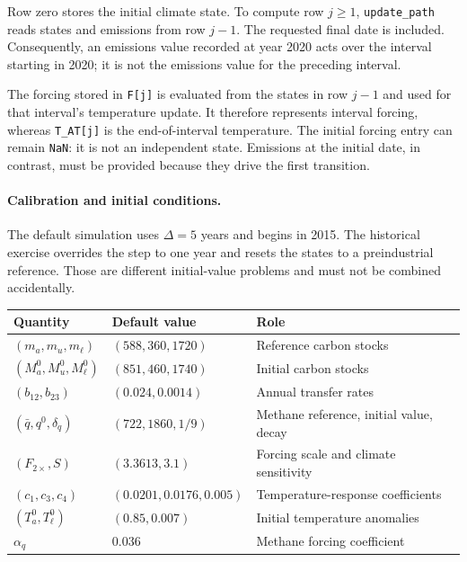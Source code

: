 \documentclass[11pt,a4paper]{article}
\begin{document}
Row zero stores the initial climate state. To compute row $j\geq1$,
\texttt{update\_path} reads states and emissions from row $j-1$.
The requested final date is included. Consequently, an emissions value
recorded at year 2020 acts over the interval starting in 2020; it is not
the emissions value for the preceding interval.

The forcing stored in \texttt{F[j]} is evaluated from the states in row
$j-1$ and used for that interval's temperature update. It therefore
represents interval forcing, whereas \texttt{T\_AT[j]} is the end-of-interval
temperature. The initial forcing entry can remain \texttt{NaN}: it is
not an independent state. Emissions at the initial date, in contrast,
must be provided because they drive the first transition.

\paragraph{Calibration and initial conditions.}
The default simulation uses $\Delta=5$ years and begins in 2015.
The historical exercise overrides the step to one year and resets the
states to a preindustrial reference. Those are different initial-value
problems and must not be combined accidentally.
\begin{center}\small
\begin{tabular}{@{}lll@{}}
\toprule
Quantity & Default value & Role\\
\midrule
$(m_a,m_u,m_\ell)$ & $(588,360,1720)$ & Reference carbon stocks\\
$(M_a^0,M_u^0,M_\ell^0)$ & $(851,460,1740)$ & Initial carbon stocks\\
$(b_{12},b_{23})$ & $(0.024,0.0014)$ & Annual transfer rates\\
$(\bar q,q^0,\delta_q)$ & $(722,1860,1/9)$ & Methane reference, initial value, decay\\
$(F_{2\times},S)$ & $(3.3613,3.1)$ & Forcing scale and climate sensitivity\\
$(c_1,c_3,c_4)$ & $(0.0201,0.0176,0.005)$ & Temperature-response coefficients\\
$(T_a^0,T_\ell^0)$ & $(0.85,0.007)$ & Initial temperature anomalies\\
$\alpha_q$ & $0.036$ & Methane forcing coefficient\\
\bottomrule
\end{tabular}
\end{center}
\end{document}
